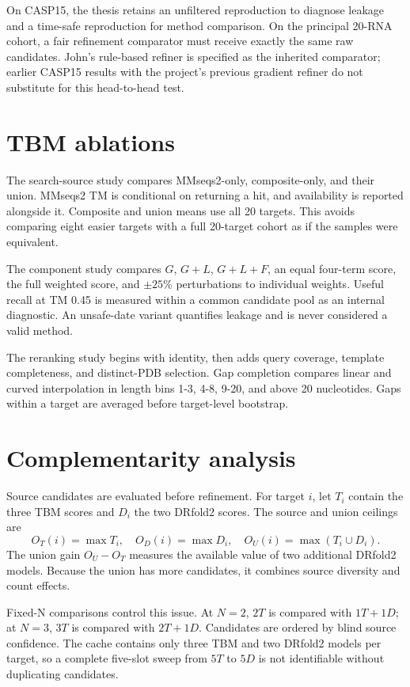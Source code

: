 \documentclass[12pt,a4paper,oneside]{report}
\begin{document}
On CASP15, the thesis retains an unfiltered reproduction to diagnose leakage and a
time-safe reproduction for method comparison. On the principal 20-RNA cohort, a fair
refinement comparator must receive exactly the same raw candidates. John's rule-based
refiner is specified as the inherited comparator; earlier CASP15 results with the
project's previous gradient refiner do not substitute for this head-to-head test.

\section{TBM ablations}

The search-source study compares MMseqs2-only, composite-only, and their union. MMseqs2
TM is conditional on returning a hit, and availability is reported alongside it.
Composite and union means use all 20 targets. This avoids comparing eight easier targets
with a full 20-target cohort as if the samples were equivalent.

The component study compares $G$, $G+L$, $G+L+F$, an equal four-term score, the full
weighted score, and $\pm25\%$ perturbations to individual weights. Useful recall at TM
0.45 is measured within a common candidate pool as an internal diagnostic. An
unsafe-date variant quantifies leakage and is never considered a valid method.

The reranking study begins with identity, then adds query coverage, template completeness,
and distinct-PDB selection. Gap completion compares linear and curved interpolation in
length bins 1-3, 4-8, 9-20, and above 20 nucleotides. Gaps within a target are averaged
before target-level bootstrap.

\section{Complementarity analysis}

Source candidates are evaluated before refinement. For target $i$, let $T_i$ contain the
three TBM scores and $D_i$ the two DRfold2 scores. The source and union ceilings are
\begin{equation}
O_T(i)=\max T_i,\quad O_D(i)=\max D_i,\quad
O_U(i)=\max(T_i\cup D_i).
\end{equation}
The union gain $O_U-O_T$ measures the available value of two additional DRfold2 models.
Because the union has more candidates, it combines source diversity and count effects.

Fixed-N comparisons control this issue. At $N=2$, $2T$ is compared with $1T+1D$; at
$N=3$, $3T$ is compared with $2T+1D$. Candidates are ordered by blind source confidence.
The cache contains only three TBM and two DRfold2 models per target, so a complete
five-slot sweep from $5T$ to $5D$ is not identifiable without duplicating candidates.
\end{document}
